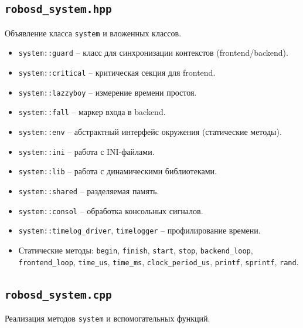 \documentclass[a4paper,12pt]{article}
\begin{document}
\subsection{\texttt{robosd\_system.hpp}}

Объявление класса \texttt{system} и вложенных классов.

\begin{itemize}
    \item \texttt{system::guard} -- класс для синхронизации контекстов (frontend/backend).
    \item \texttt{system::critical} -- критическая секция для frontend.
    \item \texttt{system::lazzyboy} -- измерение времени простоя.
    \item \texttt{system::fall} -- маркер входа в backend.
    \item \texttt{system::env} -- абстрактный интерфейс окружения (статические методы).
    \item \texttt{system::ini} -- работа с INI-файлами.
    \item \texttt{system::lib} -- работа с динамическими библиотеками.
    \item \texttt{system::shared} -- разделяемая память.
    \item \texttt{system::consol} -- обработка консольных сигналов.
    \item \texttt{system::timelog\_driver}, \texttt{timelogger} -- профилирование времени.
    \item Статические методы: \texttt{begin}, \texttt{finish}, \texttt{start}, \texttt{stop}, \texttt{backend\_loop}, \texttt{frontend\_loop}, \texttt{time\_us}, \texttt{time\_ms}, \texttt{clock\_period\_us}, \texttt{printf}, \texttt{sprintf}, \texttt{rand}.
\end{itemize}

\subsection{\texttt{robosd\_system.cpp}}

Реализация методов \texttt{system} и вспомогательных функций.
\end{document}
